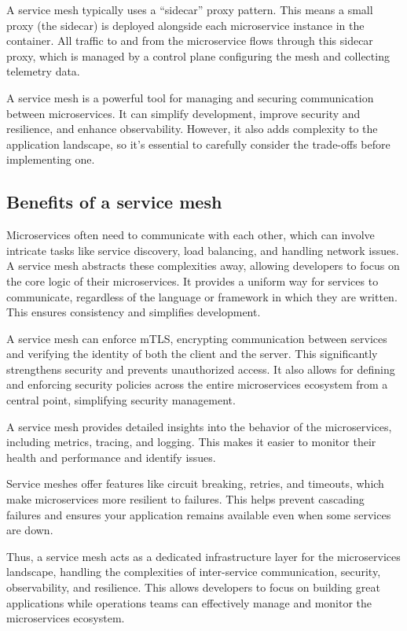 A service mesh typically uses a ``sidecar'' proxy pattern. This means a
small proxy (the sidecar) is deployed alongside each microservice
instance in the container. All traffic to and from the microservice
flows through this sidecar proxy, which is managed by a control plane
configuring the mesh and collecting telemetry data.

A service mesh is a powerful tool for managing and securing
communication between microservices. It can simplify development,
improve security and resilience, and enhance observability. However, it
also adds complexity to the application landscape, so it's essential to
carefully consider the trade-offs before implementing one.

\subsection{Benefits of a service mesh}

Microservices often need to communicate with each other, which can
involve intricate tasks like service discovery, load balancing, and
handling network issues. A service mesh abstracts these complexities
away, allowing developers to focus on the core logic of their
microservices. It provides a uniform way for services to communicate,
regardless of the language or framework in which they are written. This
ensures consistency and simplifies development.

A service mesh can enforce mTLS, encrypting communication between
services and verifying the identity of both the client and the server.
This significantly strengthens security and prevents unauthorized
access. It also allows for defining and enforcing security policies
across the entire microservices ecosystem from a central point,
simplifying security management.

A service mesh provides detailed insights into the behavior of the
microservices, including metrics, tracing, and logging. This makes it
easier to monitor their health and performance and identify issues.

Service meshes offer features like circuit breaking, retries, and
timeouts, which make microservices more resilient to failures. This
helps prevent cascading failures and ensures your application remains
available even when some services are down.

Thus, a service mesh acts as a dedicated infrastructure layer for the
microservices landscape, handling the complexities of inter-service
communication, security, observability, and resilience. This allows
developers to focus on building great applications while operations
teams can effectively manage and monitor the microservices ecosystem.

